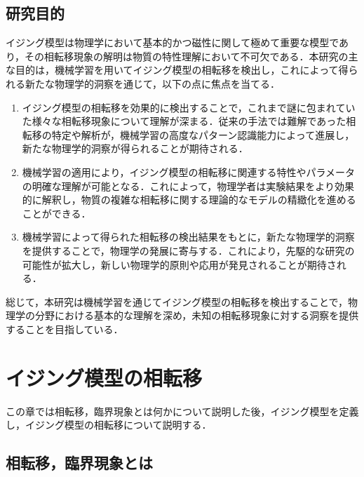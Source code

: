 \documentclass[a4paper,11pt]{jsreport}
\begin{document}
\section{研究目的}
イジング模型は物理学において基本的かつ磁性に関して極めて重要な模型であり，その相転移現象の解明は物質の特性理解において不可欠である．本研究の主な目的は，機械学習を用いてイジング模型の相転移を検出し，これによって得られる新たな物理学的洞察を通じて，以下の点に焦点を当てる．
\begin{enumerate}
  \item イジング模型の相転移を効果的に検出することで，これまで謎に包まれていた様々な相転移現象について理解が深まる．従来の手法では難解であった相転移の特定や解析が，機械学習の高度なパターン認識能力によって進展し，新たな物理学的洞察が得られることが期待される．
  \item 機械学習の適用により，イジング模型の相転移に関連する特性やパラメータの明確な理解が可能となる．これによって，物理学者は実験結果をより効果的に解釈し，物質の複雑な相転移に関する理論的なモデルの精緻化を進めることができる．
  \item 機械学習によって得られた相転移の検出結果をもとに，新たな物理学的洞察を提供することで，物理学の発展に寄与する．これにより，先駆的な研究の可能性が拡大し，新しい物理学的原則や応用が発見されることが期待される．
\end{enumerate}
総じて，本研究は機械学習を通じてイジング模型の相転移を検出することで，物理学の分野における基本的な理解を深め，未知の相転移現象に対する洞察を提供することを目指している．



\chapter{イジング模型の相転移}
この章では相転移，臨界現象とは何かについて説明した後，イジング模型を定義し，イジング模型の相転移について説明する．\cite{高橋2017相転移}\cite{田崎統計力学2}
\section{相転移，臨界現象とは}
\end{document}
